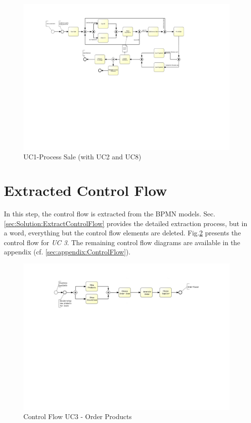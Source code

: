 \begin{figure}[h!]
	\centering
	\includegraphics[width=\textwidth, trim={4cm 10.5cm 8cm 2cm}]{img/UC1.pdf}
	\caption{UC1-Process Sale (with UC2 and UC8)}
	\label{fig:UC1}
\end{figure}




\section{Extracted Control Flow}

In this step, the control flow is extracted from the BPMN models. Sec. \ref{sec:Solution:ExtractControlFlow} provides the detailed extraction process, but in a word, everything but the control flow elements are deleted. Fig.\ref{fig:UC3Control} presents the control flow for \textit{UC 3}. The remaining control flow diagrams are available in the appendix (cf. \ref{sec:appendix:ControlFlow}).  

\begin{figure}[h!]
	\centering
	\includegraphics[width=\textwidth, trim={5cm 14cm 6cm 2cm}]{img/UC3Control.pdf}
	\caption{Control Flow UC3 - Order Products}
	\label{fig:UC3Control}
\end{figure}

